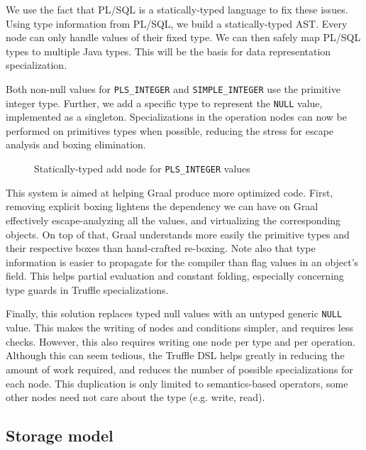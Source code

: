 \documentclass[twoside,11pt,a4paper]{article}
\newcommand{\pls}[1]{\small\texttt{#1}\normalsize}
\newcommand{\plstype}[1]{\pls{#1}}
\newcommand{\plsi}{\plstype{PLS\_INTEGER}}
\newcommand{\simpleint}{\plstype{SIMPLE\_INTEGER}}
\newcommand{\plsnull}{\pls{NULL}}
\begin{document}
We use the fact that PL/SQL is a statically-typed language to fix these issues. Using type information from PL/SQL, we build a statically-typed AST. Every node can only handle values of their fixed type. We can then safely map PL/SQL types to multiple Java types. This will be the basis for data representation specialization.

Both non-null values for \plsi{} and \simpleint{} use the primitive integer type. Further, we add a specific type to represent the \plsnull{} value, implemented as a singleton. Specializations in the operation nodes can now be performed on primitives types when possible, reducing the stress for escape analysis and boxing elimination.

\begin{figure}[t]
	
	\caption{Statically-typed add node for \plsi{} values}
	\label{fig:plsiadd}
\end{figure}

This system is aimed at helping Graal produce more optimized code. First, removing explicit boxing lightens the dependency we can have on Graal effectively escape-analyzing all the values, and virtualizing the corresponding objects. On top of that, Graal understands more easily the primitive types and their respective boxes than hand-crafted re-boxing. Note also that type information is easier to propagate for the compiler than flag values in an object's field. This helps partial evaluation and constant folding, especially concerning type guards in Truffle specializations.

Finally, this solution replaces typed null values with an untyped generic \plsnull{} value. This makes the writing of nodes and conditions simpler, and requires less checks. However, this also requires writing one node per type and per operation. Although this can seem tedious, the Truffle DSL helps greatly in reducing the amount of work required, and reduces the number of possible specializations for each node. This duplication is only limited to semantics-based operators, some other nodes need not care about the type (e.g. write, read).

\subsection{Storage model}
\end{document}
